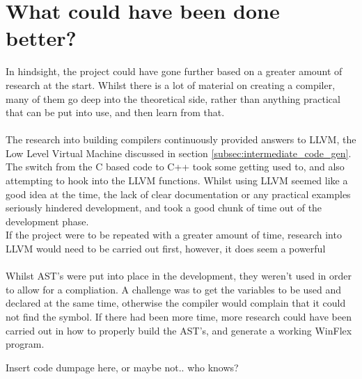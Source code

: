 \documentclass[12pt]{report}
\begin{document}
\section{What could have been done better?}\label{sec:con:better}
In hindsight, the project could have gone further based on a greater amount of research at the start.  Whilst there is a lot of material on creating a compiler, many of them go deep into the theoretical side, rather than anything practical that can be put into use, and then learn from that.\\
\\
The research into building compilers continuously provided answers to LLVM, the Low Level Virtual Machine discussed in section \ref{subsec:intermediate_code_gen}.  The switch from the C based code to C++ took some getting used to, and also attempting to hook into the LLVM functions.  Whilst using LLVM seemed like a good idea at the time, the lack of clear documentation or any practical examples seriously hindered development, and took a good chunk of time out of the development phase.\\
If the project were to be repeated with a greater amount of time, research into LLVM would need to be carried out first, however, it does seem a powerful 
\\
\\
Whilst AST's were put into place in the development, they weren't used in order to allow for a compliation.  A challenge was to get the variables to be used and declared at the same time, otherwise the compiler would complain that it could not find the symbol.  If there had been more time, more research could have been carried out in how to properly build the AST's, and generate a working WinFlex program.




\clearpage
\appendix
\appendixpage
\addappheadtotoc
Insert code dumpage here, or maybe not.. who knows?
\end{document}
